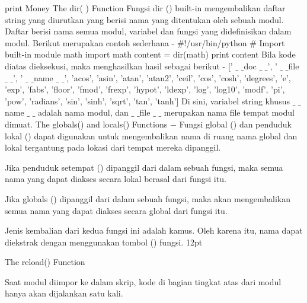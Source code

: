 \hspace*{0.5in} print Money 
The dir( ) Function 
Fungsi dir () built-in mengembalikan daftar string yang diurutkan yang berisi nama yang ditentukan oleh sebuah modul.
Daftar berisi nama semua modul, variabel dan fungsi yang didefinisikan dalam modul. Berikut merupakan contoh sederhana - 
 \hspace*{0.5in}  $  \#  $!/usr/bin/python 
 \hspace*{0.5in}  $  \#  $ Import built-in module math
 \hspace*{0.5in} import math 
 \hspace*{0.5in} content = dir(math)
 \hspace*{0.5in} print content 
Bila kode diatas dieksekusi, maka menghasilkan hasil sebagai berikut - 
 \hspace*{0.5in} [' $  \_  $ $  \_  $doc $  \_  $ $  \_  $', ' $  \_  $ $  \_  $file $  \_  $ $  \_  $', ' $  \_  $ $  \_  $name $  \_  $ $  \_  $', 'acos', 'asin', 'atan',  
 \hspace*{0.5in} 'atan2', 'ceil', 'cos', 'cosh', 'degrees', 'e', 'exp',  
 \hspace*{0.5in} 'fabs', 'floor', 'fmod', 'frexp', 'hypot', 'ldexp', 'log', 
 \hspace*{0.5in} 'log10', 'modf', 'pi', 'pow', 'radians', 'sin', 'sinh', 
 \hspace*{0.5in} 'sqrt', 'tan', 'tanh'] 
Di sini, variabel string khusus  $  \_  $ $  \_  $name $  \_  $ $  \_  $ adalah nama modul, dan  $  \_  $ $  \_  $file $  \_  $ $  \_  $ merupakan nama file tempat modul dimuat.
The $  $globals() $  $and $  $locals() $  $Functions  $ - $
Fungsi global () dan penduduk lokal () dapat digunakan untuk mengembalikan nama di ruang nama global dan lokal tergantung pada lokasi dari tempat mereka dipanggil. 
 
Jika penduduk setempat () dipanggil dari dalam sebuah fungsi, maka semua nama yang dapat diakses secara lokal berasal dari fungsi itu. 

Jika globals () dipanggil dari dalam sebuah fungsi, maka akan mengembalikan semua nama yang dapat diakses secara global dari fungsi itu. 

Jenis kembalian dari kedua fungsi ini adalah kamus. Oleh karena itu, nama dapat diekstrak dengan menggunakan tombol () fungsi. 
{12pt}

The $  $reload() $  $Function 

Saat modul diimpor ke dalam skrip, kode di bagian tingkat atas dari modul hanya akan dijalankan satu kali. 

